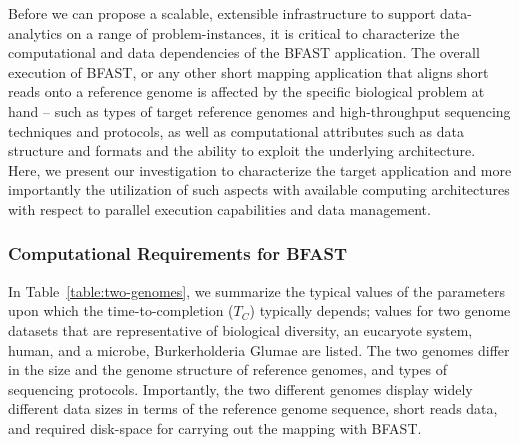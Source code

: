 \documentclass{cpeauth}
\begin{document}

Before we can propose a scalable, extensible infrastructure to support
data-analytics on a range of problem-instances, it is critical to
characterize the computational and data dependencies of the BFAST
application.  The overall execution of BFAST, or any other short
mapping application that aligns short reads onto a reference genome is
affected by the specific biological problem at hand -- such as types
of target reference genomes and high-throughput sequencing techniques
and protocols, as well as computational attributes such as data
structure and formats and the ability to exploit the underlying
architecture.  Here, we present our investigation to characterize the
target application and more importantly the utilization of such
aspects with available computing architectures with respect to
parallel execution capabilities and data management.

\subsubsection{Computational Requirements for BFAST}


In Table~\ref{table:two-genomes}, we summarize the typical values of
the parameters upon which the time-to-completion ($T_C$) typically
depends; values for two genome datasets that are representative of
biological diversity, an eucaryote system, human, and a microbe,
Burkerholderia Glumae\cite{kim2011} are listed. The two genomes differ
in the size and the genome structure of reference genomes, and types
of sequencing protocols.  Importantly, the two different genomes
display widely different data sizes in terms of the reference genome
sequence, short reads data, and required disk-space for carrying out
the mapping with BFAST.
\end{document}

